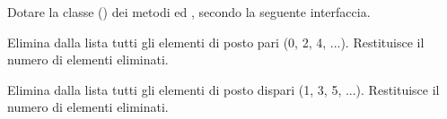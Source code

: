 Dotare la classe  () dei metodi  ed , secondo la seguente interfaccia.

\begin{methodslist}

 {
Elimina dalla lista tutti gli elementi di posto pari (0, 2, 4, ...). Restituisce il numero di elementi eliminati.
}

 {
Elimina dalla lista tutti gli elementi di posto dispari (1, 3, 5, ...). Restituisce il numero di elementi eliminati.
}

\end{methodslist}